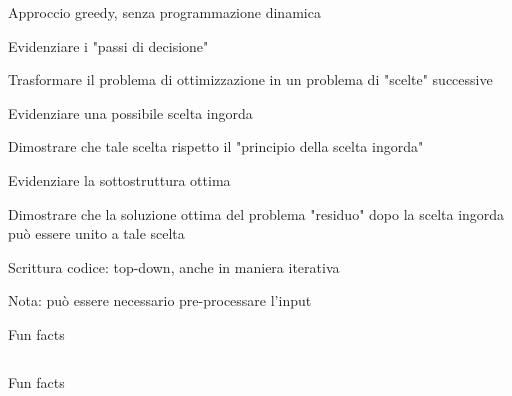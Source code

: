 \begin{frame}{Approccio greedy, senza programmazione dinamica}


\BIL
\item \alert{Evidenziare i "passi di decisione"}
\BI
\item Trasformare il problema di ottimizzazione in un problema di "scelte" successive
\EI

\item \alert{Evidenziare una possibile scelta ingorda}
\BI
\item Dimostrare che tale scelta rispetto il "principio della scelta ingorda"
\EI

\item \alert{Evidenziare la sottostruttura ottima}
\BI
\item Dimostrare che la soluzione ottima del problema "residuo" dopo la scelta ingorda può essere unito a tale scelta
\EI

\item \alert{Scrittura codice: top-down, anche in maniera iterativa}
\BI
\item Nota: può essere necessario pre-processare l'input
\EI
\EIL
\end{frame}

\begin{frame}{Fun facts}

\vspace{-12pt}
\begin{columns}[T]
\vspace{-3pt}
\begin{center}
\vspace{-3pt}
\end{center}
\end{columns}    
\smallskip
{}
\begin{center}
\end{center}

\end{frame}

\begin{frame}{Fun facts}
\vspace{-12pt}
\end{frame}


